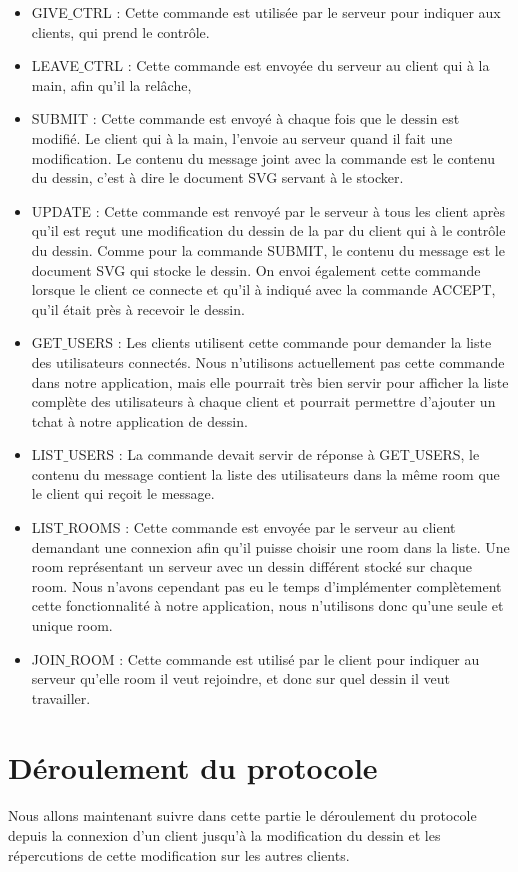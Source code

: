 \documentclass[a4paper,10pt]{article}
\begin{document}
\begin{itemize}
\item GIVE$\_$CTRL : Cette commande est utilisée par le serveur pour indiquer aux clients, qui prend le contrôle. 

\item LEAVE$\_$CTRL : Cette commande est envoyée du serveur au client qui à la main, afin qu'il la relâche,

\item SUBMIT : Cette commande est envoyé à chaque fois que le dessin est modifié. Le client qui à la main, l'envoie au serveur quand il fait une modification. Le contenu du message joint avec la commande est le contenu du dessin, c'est à dire le document SVG servant à le stocker.

\item UPDATE : Cette commande est renvoyé par le serveur à tous les client après qu'il est reçut une modification du dessin de la par du client qui à le contrôle du dessin. Comme pour la commande SUBMIT, le contenu du message est le document SVG qui stocke le dessin.
On envoi également cette commande lorsque le client ce connecte et qu'il à indiqué avec la commande ACCEPT, qu'il était près à recevoir le dessin.

\item GET$\_$USERS : Les clients utilisent cette commande pour demander la liste des utilisateurs connectés. Nous n'utilisons actuellement pas cette commande dans notre application, mais elle pourrait très bien servir pour afficher la liste complète des utilisateurs à chaque client et pourrait permettre d'ajouter un tchat à notre application de dessin.

\item LIST$\_$USERS : La commande devait servir de réponse à GET$\_$USERS, le contenu du message contient la liste des utilisateurs dans la même room que le client qui reçoit le message.

\item LIST$\_$ROOMS : Cette commande est envoyée par le serveur au client demandant une connexion afin qu'il puisse choisir une room dans la liste. Une room représentant un serveur avec un dessin différent stocké sur chaque room.
Nous n'avons cependant pas eu le temps d'implémenter complètement cette fonctionnalité à notre application, nous n'utilisons donc qu'une seule et unique room.

\item JOIN$\_$ROOM : Cette commande est utilisé par le client pour indiquer au serveur qu'elle room il veut rejoindre, et donc sur quel dessin il veut travailler.
\end{itemize}

\section{Déroulement du protocole}
\paragraph{}Nous allons maintenant suivre dans cette partie le déroulement du protocole depuis la connexion d'un client jusqu'à la modification du dessin et les répercutions de cette modification sur les autres clients.

\paragraph{}
\end{document}
